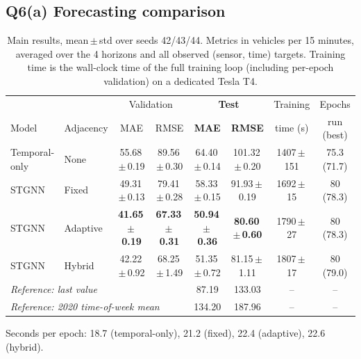 \documentclass[11pt,a4paper]{article}
\newcommand{\sd}[2]{#1{\scriptsize\,$\scriptstyle\pm$\,#2}}
\begin{document}
\subsection{Q6(a) Forecasting comparison}
\begin{table}[H]
\centering\small
\caption{Main results, mean\,$\pm$\,std over seeds 42/43/44. Metrics in vehicles per 15 minutes, averaged over the 4
horizons and all observed (sensor, time) targets. Training time is the wall-clock time of the full training loop (including
per-epoch validation) on a dedicated Tesla T4.}
\label{tab:main}
\setlength{\tabcolsep}{4pt}
\begin{adjustbox}{max width=\linewidth}
\begin{tabular}{llcccccc}
\toprule
 & & \multicolumn{2}{c}{Validation} & \multicolumn{2}{c}{\textbf{Test}} & Training & Epochs \\
\cmidrule(lr){3-4}\cmidrule(lr){5-6}
Model & Adjacency & MAE & RMSE & \textbf{MAE} & \textbf{RMSE} & time (s) & run (best) \\
\midrule
Temporal-only & None     & \sd{55.68}{0.19} & \sd{89.56}{0.30} & \sd{64.40}{0.14} & \sd{101.32}{0.20} & \sd{1407}{151} & 75.3 (71.7)\\
STGNN         & Fixed    & \sd{49.31}{0.13} & \sd{79.41}{0.28} & \sd{58.33}{0.15} & \sd{91.93}{0.19}  & \sd{1692}{15} & 80 (78.3)\\
STGNN         & Adaptive & \textbf{\sd{41.65}{0.19}} & \textbf{\sd{67.33}{0.31}} & \textbf{\sd{50.94}{0.36}} & \textbf{\sd{80.60}{0.60}} & \sd{1790}{27} & 80 (78.3)\\
STGNN         & Hybrid   & \sd{42.22}{0.92} & \sd{68.25}{1.49} & \sd{51.35}{0.72} & \sd{81.15}{1.11}  & \sd{1807}{17} & 80 (79.0)\\
\midrule
\multicolumn{4}{l}{\emph{Reference: last value}} & 87.19 & 133.03 & -- & --\\
\multicolumn{4}{l}{\emph{Reference: 2020 time-of-week mean}} & 134.20 & 187.96 & -- & --\\
\bottomrule
\end{tabular}
\end{adjustbox}

\vspace{2pt}
{\footnotesize Seconds per epoch: 18.7 (temporal-only), 21.2 (fixed), 22.4 (adaptive), 22.6 (hybrid).}


\end{table}
\end{document}
